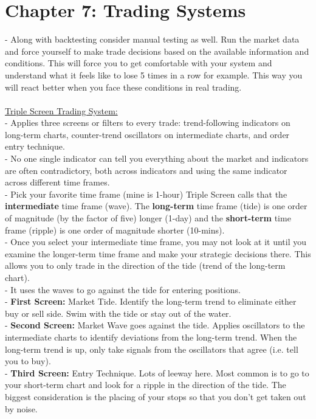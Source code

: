 \documentclass[12pt,fullpage]{article}
\begin{document}
\section*{Chapter 7: Trading Systems}
- Along with backtesting consider manual testing as well. Run the market data and force yourself to make trade decisions based on the available information and conditions. This will force you to get comfortable with your system and understand what it feels like to lose 5 times in a row for example. This way you will react better when you face these conditions in real trading.\\
\\
\underline{Triple Screen Trading System:}\\
- Applies three screens or filters to every trade: trend-following indicators on long-term charts, counter-trend oscillators on intermediate charts, and order entry technique.\\
- No one single indicator can tell you everything about the market and indicators are often contradictory, both across indicators and using the same indicator across different time frames.\\
- Pick your favorite time frame (mine is 1-hour) Triple Screen calls that the \textbf{intermediate} time frame (wave). The \textbf{long-term} time frame (tide) is one order of magnitude (by the factor of five) longer (1-day) and the \textbf{short-term} time frame (ripple) is one order of magnitude shorter (10-mins).\\
- Once you select your intermediate time frame, you may not look at it until you examine the longer-term time frame and make your strategic decisions there. This allows you to only trade in the direction of the tide (trend of the long-term chart).\\
- It uses the waves to go against the tide for entering positions.\\
- \textbf{First Screen:} Market Tide. Identify the long-term trend to eliminate either buy or sell side. Swim with the tide or stay out of the water.\\
- \textbf{Second Screen:} Market Wave goes against the tide. Applies oscillators to the intermediate charts to identify deviations from the long-term trend. When the long-term trend is up, only take signals from the oscillators that agree (i.e. tell you to buy).\\
- \textbf{Third Screen:} Entry Technique. Lots of leeway here. Most common is to go to your short-term chart and look for a ripple in the direction of the tide. The biggest consideration is the placing of your stops so that you don't get taken out by noise.\\
\end{document}
